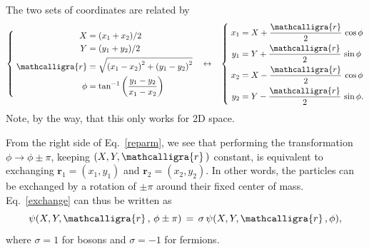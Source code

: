 \documentclass[pra,12pt]{revtex4}
\begin{document}
The two sets of coordinates are related by
\begin{align}
  \left\{\;
  \begin{aligned}
    X &= (x_1+x_2)/2 \\
    Y &= (y_1+y_2)/2 \\
    \mathcalligra{r} &= \sqrt{\left(x_1-x_2\right)^2 + \left(y_1-y_2\right)^2} \\
    \phi &= \tan^{-1}\left(\frac{y_1-y_2}{x_1-x_2}\right)
  \end{aligned}
  \right.
  \;\;\;\leftrightarrow\;\;\;
  \left\{ \;
  \begin{aligned}
    x_1 &= X + \frac{\mathcalligra{r}}{2} \,\cos\phi \\
    y_1 &= Y + \frac{\mathcalligra{r}}{2} \,\sin\phi \\
    x_2 &= X - \frac{\mathcalligra{r}}{2} \,\cos\phi \\
    y_2 &= Y - \frac{\mathcalligra{r}}{2} \,\sin\phi.
  \end{aligned}
  \right.
  \label{reparm}
\end{align}
Note, by the way, that this only works for 2D space.

From the right side of Eq.~\eqref{reparm}, we see that performing the
transformation $\phi \rightarrow \phi \pm \pi$, keeping $(X, Y,
\mathcalligra{r}\,)$ constant, is equivalent to exchanging
$\mathbf{r}_1 = (x_1,y_1)$ and $\mathbf{r}_2 =(x_2,y_2)$.  In other
words, the particles can be exchanged by a rotation of $\pm \pi$
around their fixed center of mass.  Eq.~\eqref{exchange} can thus be
written as
\begin{equation}
  \psi(X, Y, \mathcalligra{r}\,,\, \phi \pm \pi) \,=\, \sigma \, \psi(X,
  Y, \mathcalligra{r}\,, \phi),
\end{equation}
where $\sigma = 1$ for bosons and $\sigma = -1$ for fermions.
\end{document}
